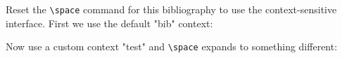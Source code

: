 \documentclass[a4paper]{article}
\newcommand{\cmd}[1]{\texttt{\textbackslash #1}}
\begin{document}
Reset the \cmd{space} command for this bibliography to use the
context-sensitive interface. First we use the default "bib" context:
\printbibliography

Now use a custom context "test" and \cmd{space} expands to something different:
\printbibliography
\end{document}
